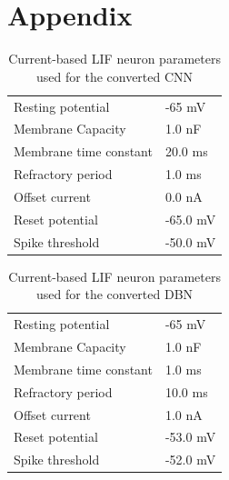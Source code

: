 \chapter{Appendix }




\begin{table}[]
\caption{Current-based LIF neuron parameters used for the converted CNN}
\centering
\label{cnnlifparam}
\begin{tabular}{|ll|}
\hline
Resting potential    		& -65 mV 		    \\
Membrane Capacity    		& 1.0 nF 		     \\
Membrane time constant    	& 20.0 ms		             \\
Refractory period     		& 1.0 ms		                 \\
Offset current    			& 0.0 nA		              \\
Reset potential     		& -65.0 mV 	               \\
Spike threshold     		& -50.0 mV          \\\hline
\end{tabular}
\end{table}

\begin{table}[]
\caption{Current-based LIF neuron parameters used for the converted DBN}
\centering
\label{cubalifparam}
\begin{tabular}{|ll|}
\hline
Resting potential    		& -65 mV 		    \\
Membrane Capacity    		& 1.0 nF 		     \\
Membrane time constant    	& 1.0 ms		             \\
Refractory period     		& 10.0 ms		                 \\
Offset current    			& 1.0 nA		              \\
Reset potential     		& -53.0 mV 	               \\
Spike threshold     		& -52.0 mV          \\\hline
\end{tabular}
\end{table}



